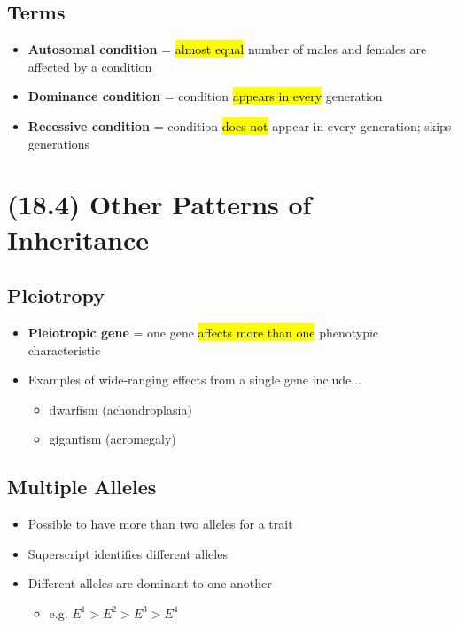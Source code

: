 \documentclass[a4paper,12pt]{article}
\begin{document}
\subsection{Terms}
\begin{itemize}
    \item{\textbf{Autosomal condition} = \hl{almost equal} number of males and females are affected by a condition}
    \item{\textbf{Dominance condition} = condition \hl{appears in every} generation}
    \item{\textbf{Recessive condition} = condition \hl{does not} appear in every generation; skips generations}
\end{itemize}

\section{(18.4) Other Patterns of Inheritance}

\subsection{Pleiotropy}
\begin{itemize}
    \item{\textbf{Pleiotropic gene} = one gene \hl{affects more than one} phenotypic characteristic}
    \item{
            Examples of wide-ranging effects from a single gene include...
            \begin{itemize}
                \item{dwarfism (achondroplasia)}
                \item{gigantism (acromegaly)}
\end{itemize}
        }
\end{itemize}

\subsection{Multiple Alleles}
\begin{itemize}
    \item{Possible to have more than two alleles for a trait}
    \item{Superscript identifies different alleles}
    \item{
            Different alleles are dominant to one another
            \begin{itemize}
                \item{e.g. $E^1 > E^2 > E^3 > E^4$}
            \end{itemize}
        }
\end{itemize}
\end{document}
